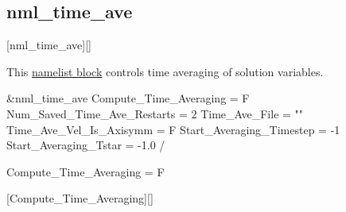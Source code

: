 \subsection{nml\_time\_ave}
\label{SEC:nml_time_ave}
\inp*[nmlTimeAve]{}[nml\_time\_ave][]

This \hyperref[SEC:User_Input]{namelist block}
controls time averaging of solution variables.

\begin{nmlblocklst}[
,label={LST:nml_time_ave}
,caption={Namelist nml\_time\_ave.}
]
&nml_time_ave
  Compute_Time_Averaging      =  F
  Num_Saved_Time_Ave_Restarts =  2
  Time_Ave_File               = ""
  Time_Ave_Vel_Is_Axisymm     =  F
  Start_Averaging_Timestep    = -1
  Start_Averaging_Tstar       = -1.0
/
\end{nmlblocklst}


\begin{nmldescitem}
Compute_Time_Averaging = F
\end{nmldescitem}
[Compute\_Time\_Averaging][]

